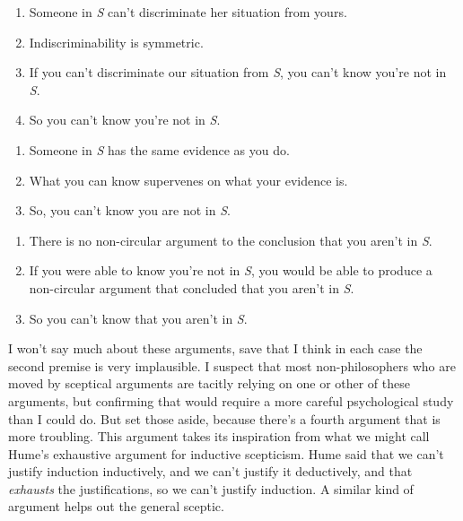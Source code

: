 \bigskip
\noindent \begin{minipage}{\textwidth}

\begin{enumerate}
\item Someone in \textit{S} can't discriminate her situation from yours.
\item Indiscriminability is symmetric.
\item If you can't discriminate our situation from \textit{S}, you can't know you're not in \textit{S}.
\item So you can't know you're not in \textit{S}.
\end{enumerate}
\end{minipage}

\medskip
\noindent \begin{minipage}{\textwidth}

\begin{enumerate}
\item Someone in \textit{S} has the same evidence as you do.
\item What you can know supervenes on what your evidence is.
\item So, you can't know you are not in \textit{S}.
\end{enumerate}
\end{minipage}

\medskip
\noindent \begin{minipage}{\textwidth}

\begin{enumerate}
\item There is no non-circular argument to the conclusion that you aren't in \textit{S}.
\item If you were able to know you're not in \textit{S}, you would be able to produce a non-circular argument that concluded that you aren't in \textit{S}.
\item So you can't know that you aren't in \textit{S}.
\end{enumerate}
\end{minipage}
\bigskip

\noindent I won't say much about these arguments, save that I think in each case the second premise is very implausible. I suspect that most non-philosophers who are moved by sceptical arguments are tacitly relying on one or other of these arguments, but confirming that would require a more careful psychological study than I could do. But set those aside, because there's a fourth argument that is more troubling. This argument takes its inspiration from what we might call Hume's exhaustive argument for inductive scepticism. Hume said that we can't justify induction inductively, and we can't justify it deductively, and that \textit{exhausts} the justifications, so we can't justify induction. A similar kind of argument helps out the general sceptic.

